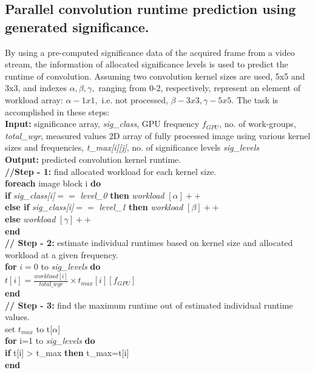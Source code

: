 \documentclass[journal]{IEEEtran}
\begin{document}
\subsection{Parallel convolution runtime prediction using generated significance.} 
By using a pre-computed significance data of the acquired frame from a video stream, the information of allocated significance levels is used to predict the runtime of convolution. Assuming two convolution kernel sizes are used, 5x5 and 3x3, and indexes $ \alpha , \beta , \gamma , $ ranging from 0-2, respectively, represent an element of workload array: $ \alpha - 1x1 , $ i.e. not processed,  $ \beta  - 3x3,  \gamma  -5x5.  $ The task is accomplished in these steps:\\
\textbf{Input:} significance array,\textit{ sig\_class}, GPU frequency \textit{$ f _{GPU}$}, no. of work-groups, \textit{total\_wgr}, measured values 2D array of fully processed image using various kernel sizes and frequencies, \textit{t\_max[i][j]}, no. of significance levels \textit{sig\_levels} \\
\textbf{Output:} predicted convolution kernel runtime. \\
\textbf{//Step - 1:} find allocated workload for each kernel size. \\
\textbf{foreach} image block i \textbf{do}\\
\indent    \textbf{if} \textit{sig\_class[i]}$ ==$\textit{ level\_0} \textbf{then} \textit{workload} $[  \alpha ]++$ \\
\indent	\textbf{else if} \textit{sig\_class[i]}$ ==$ \textit{level\_1} \textbf{then} \textit{workload} $[ \beta ]++$ \\
\indent	\textbf{else} \textit{workload} $[ \gamma ]++$ \\
\textbf{end} \\
\textbf{// Step - 2:} estimate individual runtimes based on kernel size and allocated workload at a given frequency. \\
\textbf{for} $ i = 0 $ to \textit{sig\_levels} \textbf{do} \\
\indent $ t[i] = \frac{workload[i]}{total\_wgr} \times t _{max}[i][f _{GPU}] $ \\
\textbf{end} \\
\textbf{// Step - 3:} find the maximum runtime out of estimated individual runtime values. \\
set $ t _{max} $ to t[$ \alpha $] \\
\textbf{for} i=1 to\textit{ sig\_levels} \textbf{do} \\
\indent \textbf{if}  t[i] > t\_max \textbf{then} t\_max=t[i]  \\
\textbf{end} \\
\end{document}
